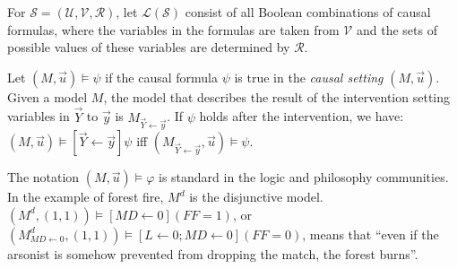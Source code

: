 \documentclass[UTF8]{ctexbook}
\begin{document}
For $\mathcal{S}=(\mathcal{U}, \mathcal{V}, \mathcal{R})$, let $\mathcal{L}(\mathcal{S})$ consist of all Boolean combinations of causal formulas, where the variables in the formulas are taken from $\mathcal{V}$ and the sets of possible values of these variables are determined by $\mathcal{R}$.

Let $(M, \vec{u}) \models \psi$ if the causal formula $\psi$ is true in the \textit{causal setting} $(M, \vec{u})$. Given a model $M$, the model that describes the result of the intervention setting variables in $\vec{Y}$ to $\vec{y}$ is $M_{\vec{Y} \leftarrow \vec{y}}$. If $\psi$ holds after the intervention, we have: $(M, \vec{u})\models[\vec{Y} \leftarrow \vec{y}] \psi$ iff $(M_{\vec{Y} \leftarrow \vec{y}}, \vec{u})\models\psi$.

The notation $(M, \vec{u}) \models \varphi$ is standard in the logic and philosophy communities. In the example of forest fire, $M^{d}$ is the disjunctive model. $\left(M^{d},(1,1)\right) \models [MD \leftarrow 0](FF=1)$, or $\left(M_{M D \leftarrow 0}^{d},(1,1)\right) \models [L \leftarrow 0 ; M D \leftarrow 0](F F=0)$, means that ``even if the arsonist is somehow prevented from dropping the match, the forest burns''.
\end{document}
